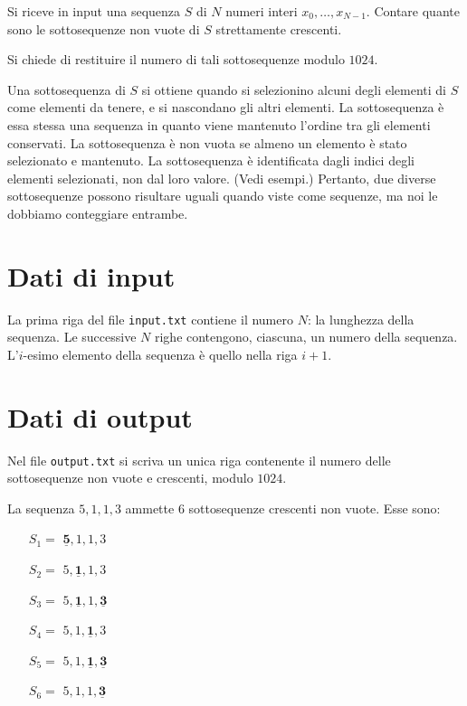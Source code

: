 \renewcommand{\nomebreve}{count\_poldo}
\renewcommand{\titolo}{Contare le sottosequenze crescenti}

\introduzione{}

Si riceve in input una sequenza $S$ di $N$ numeri interi $x_0,\dots,x_{N-1}$.
Contare quante sono le sottosequenze non vuote di $S$ strettamente crescenti.

Si chiede di restituire il numero di tali sottosequenze modulo $1024$.

Una sottosequenza di $S$ si ottiene quando si selezionino alcuni degli elementi di $S$ come elementi da tenere, e si nascondano gli altri elementi. La sottosequenza è essa stessa una sequenza in quanto viene mantenuto l'ordine tra gli elementi conservati. La sottosequenza è non vuota se almeno un elemento è stato selezionato e mantenuto. La sottosequenza è identificata dagli indici degli elementi selezionati, non dal loro valore. (Vedi esempi.) Pertanto, due diverse sottosequenze possono risultare uguali quando viste come sequenze, ma noi le dobbiamo conteggiare entrambe. 

\section*{Dati di input}
La prima riga del file \verb'input.txt' contiene il numero $N$: la lunghezza della sequenza.
Le successive $N$ righe contengono, ciascuna, un numero della sequenza.
L'$i$-esimo elemento della sequenza è quello nella riga $i+1$.

\section*{Dati di output}
Nel file \verb'output.txt' si scriva un unica riga contenente
il numero delle sottosequenze non vuote e crescenti, modulo $1024$.


La sequenza $5, 1, 1, 3$ ammette $6$ sottosequenze crescenti non vuote. Esse sono:
\begin{enumerate}
  \item[$S_1 =$] $\underline{\mathbf{5}}, 1, 1, 3$
  \item[$S_2 =$] $5, \underline{\mathbf{1}}, 1, 3$
  \item[$S_3 =$] $5, \underline{\mathbf{1}}, 1, \underline{\mathbf{3}}$
  \item[$S_4 =$] $5, 1, \underline{\mathbf{1}}, 3$
  \item[$S_5 =$] $5, 1, \underline{\mathbf{1}}, \underline{\mathbf{3}}$
  \item[$S_6 =$] $5, 1, 1, \underline{\mathbf{3}}$
\end{enumerate}

